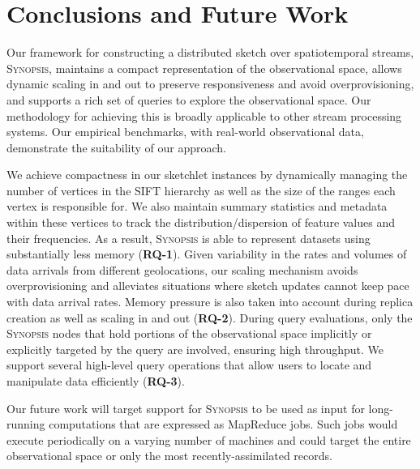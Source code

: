 \section{Conclusions and Future Work}
\label{sec:conclusions}
Our framework for constructing a distributed sketch over spatiotemporal streams, \textsc{Synopsis}, maintains a compact representation of the observational space, allows dynamic scaling in and out to preserve responsiveness and avoid overprovisioning, and supports a rich set of queries to explore the observational space. Our methodology for achieving this is broadly applicable to other stream processing systems.  Our empirical benchmarks, with real-world observational data, demonstrate the suitability of our approach.

We achieve compactness in our sketchlet instances by dynamically managing the number of vertices in the SIFT hierarchy as well as the size of the ranges each vertex is responsible for. We also maintain summary statistics and metadata within these vertices to track the distribution/dispersion of feature values and their frequencies. As a result, \textsc{Synopsis} is able to represent datasets using substantially less memory (\textbf{RQ-1}). Given variability in the rates and volumes of data arrivals from different geolocations, our scaling mechanism avoids overprovisioning and alleviates situations where sketch updates cannot keep pace with data arrival rates. Memory pressure is also taken into account during replica creation as well as scaling in and out (\textbf{RQ-2}). During query evaluations, only the \textsc{Synopsis} nodes that hold portions of the observational space implicitly or explicitly targeted by the query are involved, ensuring high throughput. We support several high-level query operations that allow users to locate and manipulate data efficiently (\textbf{RQ-3}).

Our future work will target support for \textsc{Synopsis} to be used as input for long-running computations that are expressed as MapReduce jobs. Such jobs would execute periodically on a varying number of machines and could target the entire observational space or only the most recently-assimilated records.
